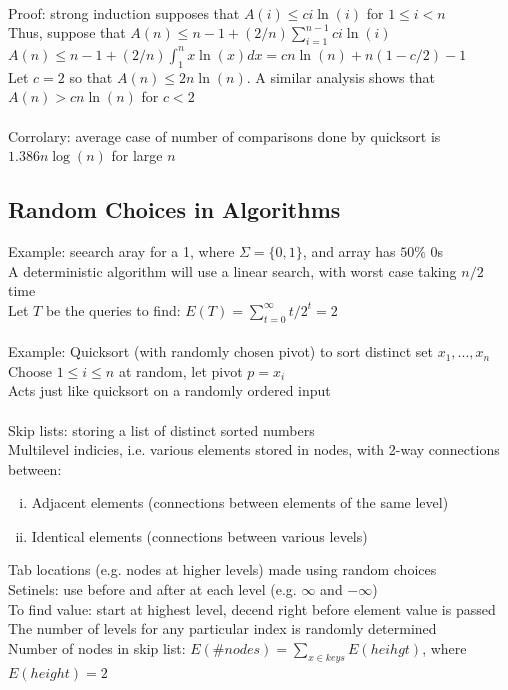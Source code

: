 \documentclass{article}
\begin{document}
			\\
			Proof: strong induction supposes that $A(i) \leq ci\ln(i)$ for $1 \leq i < n$ \\
			Thus, suppose that $A(n) \leq n - 1 + (2/n)\sum_{i = 1}^{n - 1} ci \ln(i)$ \\
			$A(n) \leq n - 1 + (2/n)\int_1^n x \ln(x) dx = cn\ln(n) + n(1 - c/2) - 1$ \\
			Let $c = 2$ so that $A(n) \leq 2 n\ln(n)$. A similar analysis shows that $A(n) > cn\ln(n)$ for $c < 2$ \\
			\\
			Corrolary: average case of number of comparisons done by quicksort is $1.386n\log(n)$ for large $n$
		\subsection{Random Choices in Algorithms}
			Example: seearch aray for a 1, where $\Sigma = \{0, 1\}$, and array has $50\%$ 0s \\
			A deterministic algorithm will use a linear search, with worst case taking $n/2$ time \\
			Let $T$ be the queries to find: $E(T) = \sum_{t = 0}^\infty t/2^t = 2$ \\
			\\
			Example: Quicksort (with randomly chosen pivot) to sort distinct set $x_1, ..., x_n$ \\
			Choose $1 \leq i \leq n$ at random, let pivot $p = x_i$ \\
			Acts just like quicksort on a randomly ordered input \\
			\\
			Skip lists: storing a list of distinct sorted numbers \\
			Multilevel indicies, i.e. various elements stored in nodes, with 2-way connections between:
			\begin{enumerate}[(i)]
				\item Adjacent elements (connections between elements of the same level)
				\item Identical elements (connections between various levels)
				\end{enumerate}
			Tab locations (e.g. nodes at higher levels) made using random choices \\
			Setinels: use before and after at each level (e.g. $\infty$ and $-\infty$) \\
			To find value: start at highest level, decend right before element value is passed \\
			The number of levels for any particular index is randomly determined \\
			Number of nodes in skip list: $E(\#nodes) = \sum_{x \in keys}E(heihgt)$, where $E(height) = 2$
		\clearpage
		
\end{document}
